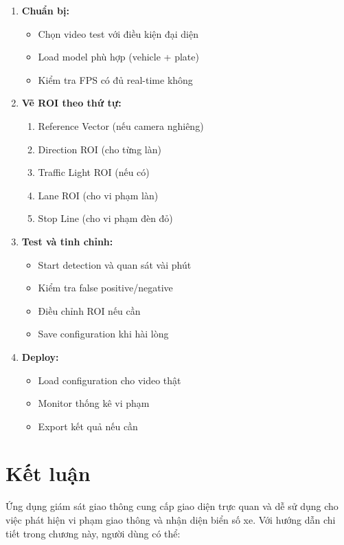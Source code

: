 \begin{enumerate}
    \item \textbf{Chuẩn bị:}
    \begin{itemize}
        \item Chọn video test với điều kiện đại diện
        \item Load model phù hợp (vehicle + plate)
        \item Kiểm tra FPS có đủ real-time không
    \end{itemize}

    \item \textbf{Vẽ ROI theo thứ tự:}
    \begin{enumerate}
        \item Reference Vector (nếu camera nghiêng)
        \item Direction ROI (cho từng làn)
        \item Traffic Light ROI (nếu có)
        \item Lane ROI (cho vi phạm làn)
        \item Stop Line (cho vi phạm đèn đỏ)
    \end{enumerate}

    \item \textbf{Test và tinh chỉnh:}
    \begin{itemize}
        \item Start detection và quan sát vài phút
        \item Kiểm tra false positive/negative
        \item Điều chỉnh ROI nếu cần
        \item Save configuration khi hài lòng
    \end{itemize}

    \item \textbf{Deploy:}
    \begin{itemize}
        \item Load configuration cho video thật
        \item Monitor thống kê vi phạm
        \item Export kết quả nếu cần
    \end{itemize}
\end{enumerate}

\section{Kết luận}

Ứng dụng giám sát giao thông cung cấp giao diện trực quan và dễ sử dụng cho việc phát hiện vi phạm giao thông và nhận diện biển số xe. Với hướng dẫn chi tiết trong chương này, người dùng có thể:

